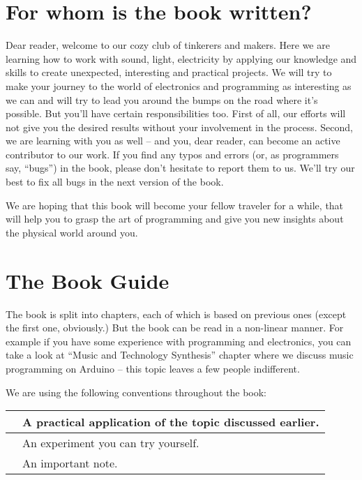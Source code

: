 \documentclass[../sparc.tex]{subfiles}
\begin{document}
\section*{For whom is the book written?}

Dear reader, welcome to our cozy club of tinkerers and makers.  Here we are
learning how to work with sound, light, electricity by applying our knowledge
and skills to create unexpected, interesting and practical projects.  We will
try to make your journey to the world of electronics and programming as
interesting as we can and will try to lead you around the bumps on the road
where it's possible.  But you'll have certain responsibilities too.  First of
all, our efforts will not give you the desired results without your involvement
in the process.  Second, we are learning with you as well -- and you, dear
reader, can become an active contributor to our work.  If you find any typos and
errors (or, as programmers say, ``bugs'') in the book, please don't hesitate to
report them to us.  We'll try our best to fix all bugs in the next version of
the book.

We are hoping that this book will become your fellow traveler for a while, that
will help you to grasp the art of programming and give you new insights about
the physical world around you.

\section*{The Book Guide}

The book is split into chapters, each of which is based on previous ones (except
the first one, obviously.)  But the book can be read in a non-linear manner.
For example if you have some experience with programming and electronics, you
can take a look at ``Music and Technology Synthesis'' chapter where we discuss
music programming on Arduino -- this topic leaves a few people indifferent.

We are using the following conventions throughout the book:

\begin{table}[H]
  \centering
  \def\arraystretch{3.0}%
  \begin{tabular}{|m{4em}|m{15em}|}
    \hline
    
    & A practical application of the topic discussed earlier. \\
    \hline
    
    & An experiment you can try yourself. \\
    \hline
    
    & An important note. \\
    \hline
  \end{tabular}
\end{table}
\end{document}
